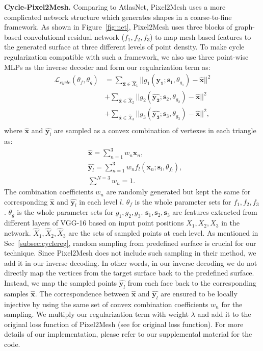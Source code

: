 \noindent\textbf{Cycle-Pixel2Mesh.}
Comparing to AtlasNet, Pixel2Mesh uses a more complicated network structure which generates shapes in a coarse-to-fine framework. As shown in Figure~\ref{fig:net}, Pixel2Mesh uses three blocks of graph-based convolutional residual network ($f_1,f_2,f_3$) to map mesh-based features to the generated surface at three different levels of point density. To make cycle regularization compatible with such a framework, we also use three point-wise MLPs as the inverse decoder and form our regularization term as:
\begin{equation}
\begin{aligned}
\mathcal{L}_{cycle}(\theta_f,\theta_g) 
&= \sum_{\hat{\mathbf{x}} \in \hat{X}_1}||g_{1}(\hat{\mathbf{y_1}};\mathbf{s}_1,\theta_{g_1}) - \hat{\mathbf{x}}||^2\\
&+ \sum_{\hat{\mathbf{x}} \in \hat{X}_2}||g_{2}(\hat{\mathbf{y_2}};\mathbf{s}_2,\theta_{g_2}) - \hat{\mathbf{x}}||^2\\
&+ \sum_{\hat{\mathbf{x}} \in \hat{X}_3}||g_{3}(\hat{\mathbf{y_3}};\mathbf{s}_3,\theta_{g_3}) - \hat{\mathbf{x}}||^2,\\
\end{aligned}
\end{equation}
where $\hat{\mathbf{x}}$ and $\hat{\mathbf{y}_l}$ are sampled as a convex combination of vertexes in each triangle as:
\begin{equation}
\begin{aligned}
\label{equ:sample}
&\hat{\mathbf{x}} = \sum^{3}_{n=1} w_n\mathbf{x}_n, \\
&\hat{\mathbf{y}_l} = \sum^{3}_{n=1} w_nf_l(\mathbf{x}_n;\mathbf{s}_l,\theta_{f_l}),\\
&\sum^{N=3} w_n = 1.
\end{aligned}
\end{equation}
The combination coefficients $w_n$ are randomly generated but kept the same for corresponding $\hat{\mathbf{x}}$ and $\hat{\mathbf{y}_l}$ in each level $l$. $\theta_f$ is the whole parameter sets for $f_1,f_2,f_3$. $\theta_g$ is the whole parameter sets for $g_1,g_2,g_3$. $\mathbf{s}_1,\mathbf{s}_2,\mathbf{s}_3$ are features extracted from different layers of VGG-16 based on input point positions $X_1,X_2,X_3$ in the network. $\hat{X}_1,\hat{X}_2,\hat{X}_3$ are the sets of sampled points at each level.
As mentioned in Sec~\ref{subsec:cyclereg}, random sampling from predefined surface is crucial for our technique. Since Pixel2Mesh does not include such sampling in their method, we add it in our inverse decoding. In other words, in our inverse decoding we do not directly map the vertices from the target surface back to the predefined surface. Instead, we map the sampled points $\hat{\mathbf{y}_l}$ from each face back to the corresponding samples $\hat{\mathbf{x}}$. The correspondence between $\hat{\mathbf{x}}$ and $\hat{\mathbf{y}_l}$ are ensured to be locally injective by using the same set of convex combination coefficients $w_n$ for the sampling. We multiply our regularization term with weight $\lambda$ and add it to the original loss function of Pixel2Mesh (see \cite{pixel2mesh} for original loss function). For more details of our implementation, please refer to our supplemental material for the code.

